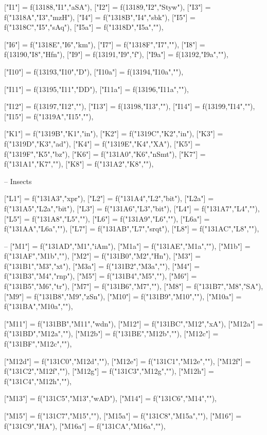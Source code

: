 \documentclass{article}
\begin{document}
\begin{luacode*}
{	["I1"] = f(13188,"I1","aSA"),
	["I2"] = f(13189,"I2","Styw"),
	["I3"] = f("1318A","I3","mzH"),
	["I4"] = f("1318B","I4","sbk"),
	["I5"] = f("1318C","I5","sAq"),
	["I5a"] = f("1318D","I5a",""),

	["I6"] = f("1318E","I6","km"),
	["I7"] = f("1318F","I7",""),
	["I8"] = f(13190,"I8","Hfn"),
	["I9"] = f(13191,"I9","f"),
	["I9a"] = f(13192,"I9a",""),

	["I10"] = f(13193,"I10","D"),
	["I10a"] = f(13194,"I10a",""),

	["I11"] = f(13195,"I11","DD"),
	["I11a"] = f(13196,"I11a",""),

	["I12"] = f(13197,"I12",""),
	["I13"] = f(13198,"I13",""),
	["I14"] = f(13199,"I14",""),
	["I15"] = f("1319A","I15",""),




	["K1"] = f("1319B","K1","in"),
	["K2"] = f("1319C","K2","in"),
	["K3"] = f("1319D","K3","ad"),
	["K4"] = f("1319E","K4","XA"),
	["K5"] = f("1319F","K5","bz"),
	["K6"] = f("131A0","K6","nSmt"),
	["K7"] = f("131A1","K7",""),
	["K8"] = f("131A2","K8",""),

-- Insects

	["L1"] = f("131A3","xpr"),
	["L2"] = f("131A4","L2","bit"),
	["L2a"] = f("131A5","L2a","bit"),
	["L3"] = f("131A6","L3","bit"),
	["L4"] = f("131A7","L4",""),
	["L5"] = f("131A8","L5",""),
	["L6"] = f("131A9","L6",""),
	["L6a"] = f("131AA","L6a",""),
	["L7"] = f("131AB","L7","srqt"),
	["L8"] = f("131AC","L8",""),

-- 
	["M1"] = f("131AD","M1","iAm"),
	["M1a"] = f("131AE","M1a",""),
	["M1b"] = f("131AF","M1b",""),
	["M2"] = f("131B0","M2","Hn"),
	["M3"] = f("131B1","M3","xt"),
	["M3a"] = f("131B2","M3a",""),
	["M4"] = f("131B3","M4","rnp"),
	["M5"] = f("131B4","M5",""),
	["M6"] = f("131B5","M6","tr"),
	["M7"] = f("131B6","M7",""),
	["M8"] = f("131B7","M8","SA"),
	["M9"] = f("131B8","M9","zSn"),
	["M10"] = f("131B9","M10",""),
	["M10a"] = f("131BA","M10a",""),


	["M11"] = f("131BB","M11","wdn"),
	["M12"] = f("131BC","M12","xA"),
	["M12a"] = f("131BD","M12a",""),
	["M12b"] = f("131BE","M12b",""),
	["M12c"] = f("131BF","M12c",""),

	["M12d"] = f("131C0","M12d",""),
	["M12e"] = f("131C1","M12e",""),
	["M12f"] = f("131C2","M12f",""),
	["M12g"] = f("131C3","M12g",""),
	["M12h"] = f("131C4","M12h",""),


	["M13"] = f("131C5","M13","wAD"),
	["M14"] = f("131C6","M14",""),


	["M15"] = f("131C7","M15",""),
	["M15a"] = f("131C8","M15a",""),
	["M16"] = f("131C9","HA"),
	["M16a"] = f("131CA","M16a",""),


}
\end{luacode*}
\end{document}
